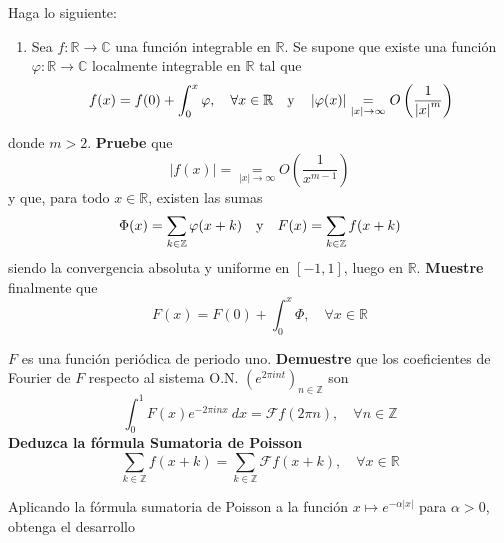 \documentclass[12pt]{report}
\theoremstyle{largebreak}
\newcommand\abs[1]{\ensuremath{\left|#1\right|}}
\newcommand\cf[3]{\ensuremath{#1:#2\rightarrow#3}}
\newcommand{\fou}[1]{\ensuremath{\mathcal{F}#1}}
\begin{document}
    \begin{excer}
        Haga lo siguiente:
        \begin{enumerate}
            \item Sea $\cf{f}{\mathbb{R}}{\mathbb{C}}$ una función integrable en $\mathbb{R}$. Se supone que existe una función $\cf{\varphi}{\mathbb{R}}{\mathbb{C}}$ localmente integrable en $\mathbb{R}$ tal que
            \begin{equation*}
                f(x)=f(0)+\int_0^{x}\varphi,\quad\forall x\in\mathbb{R}\quad\textup{y}\quad\abs{\varphi(x)}\underset{\abs{x}\rightarrow\infty}{=}O\left(\frac{1}{\abs{x}^m}\right)
            \end{equation*}
        \end{enumerate}
        donde $m>2$. \textbf{Pruebe} que
        \begin{equation*}
            \abs{f(x)}=\underset{\abs{x}\rightarrow\infty}{=}O\left(\frac{1}{x^{ m-1}}\right)
        \end{equation*}
        y que, para todo $x\in\mathbb{R}$, existen las sumas
        \begin{equation*}
            \Phi(x)=\sum_{k\in\mathbb{Z}}\varphi(x+k)\quad\textup{y}\quad F(x)=\sum_{ k\in\mathbb{Z}}f(x+k)
        \end{equation*}
        siendo la convergencia absoluta y uniforme en $[-1,1]$, luego en $\mathbb{R}$. \textbf{Muestre} finalmente que
        \begin{equation*}
            F(x)=F(0)+\int_0^x\Phi,\quad\forall x\in\mathbb{R}
        \end{equation*}
        \item $F$ es una función periódica de periodo uno. \textbf{Demuestre} que los coeficientes de Fourier de $F$ respecto al sistema O.N. $\left(e^{2\pi int} \right)_{n\in\mathbb{Z}}$ son
        \begin{equation*}
            \int_0^1 F(x)e^{ -2\pi inx}\:dx=\fou{f}(2\pi n),\quad\forall n\in\mathbb{Z}
        \end{equation*}
        \textbf{Deduzca la fórmula Sumatoria de Poisson}
        \begin{equation*}
            \sum_{ k\in\mathbb{Z}}f(x+k)=\sum_{ k\in\mathbb{Z}}\fou{f}(x+k),\quad\forall x\in\mathbb{R}
        \end{equation*}
        \item Aplicando la fórmula sumatoria de Poisson a la función $x\mapsto e^{-\alpha\abs{x}}$ para $\alpha>0$, obtenga el desarrollo
        \begin{equation*}

\end{equation*}
\end{excer}
\end{document}
